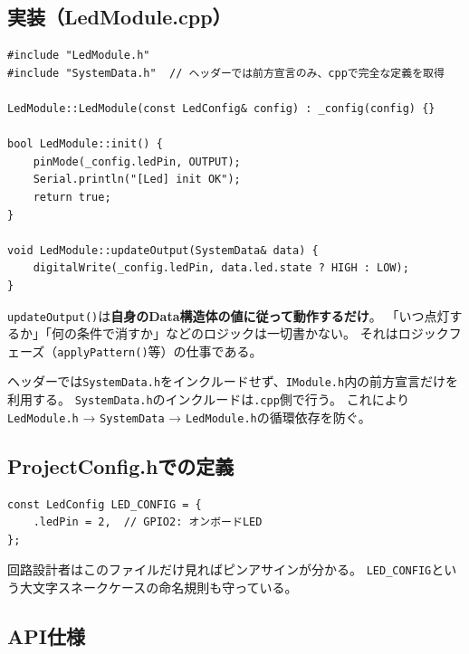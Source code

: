\subsection{実装（LedModule.cpp）}

\begin{lstlisting}[style=cppstyle, caption={LedModule.cpp}]
#include "LedModule.h"
#include "SystemData.h"  // ヘッダーでは前方宣言のみ、cppで完全な定義を取得

LedModule::LedModule(const LedConfig& config) : _config(config) {}

bool LedModule::init() {
    pinMode(_config.ledPin, OUTPUT);
    Serial.println("[Led] init OK");
    return true;
}

void LedModule::updateOutput(SystemData& data) {
    digitalWrite(_config.ledPin, data.led.state ? HIGH : LOW);
}
\end{lstlisting}

\begin{pointbox}[出力モジュールの責務]
\texttt{updateOutput()}は\textbf{自身のData構造体の値に従って動作するだけ}。
「いつ点灯するか」「何の条件で消すか」などのロジックは一切書かない。
それはロジックフェーズ（\texttt{applyPattern()}等）の仕事である。
\end{pointbox}

\begin{pointbox}[.h/.cpp分離のルール]
ヘッダーでは\texttt{SystemData.h}をインクルードせず、\texttt{IModule.h}内の前方宣言だけを利用する。
\texttt{SystemData.h}のインクルードは\texttt{.cpp}側で行う。
これにより\texttt{LedModule.h} → \texttt{SystemData} → \texttt{LedModule.h}の循環依存を防ぐ。
\end{pointbox}

\subsection{ProjectConfig.hでの定義}

\begin{lstlisting}[style=cppstyle, caption={ProjectConfig.hでのConfig定義}]
const LedConfig LED_CONFIG = {
    .ledPin = 2,  // GPIO2: オンボードLED
};
\end{lstlisting}

回路設計者はこのファイルだけ見ればピンアサインが分かる。
\texttt{LED\_CONFIG}という大文字スネークケースの命名規則も守っている。

\subsection{API仕様}


